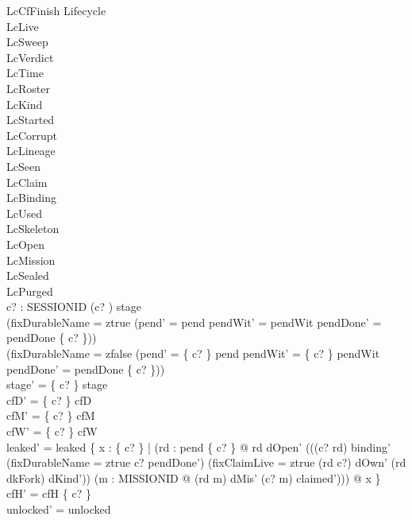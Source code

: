 \documentclass[a4paper,10pt,fleqn]{article}
\begin{document}
\begin{schema}{LcCfFinish}
\Delta Lifecycle \\
\Xi LcLive \\
\Xi LcSweep \\
\Xi LcVerdict \\
\Xi LcTime \\
\Xi LcRoster \\
\Xi LcKind \\
\Xi LcStarted \\
\Xi LcCorrupt \\
\Xi LcLineage \\
\Xi LcSeen \\
\Xi LcClaim \\
\Xi LcBinding \\
\Xi LcUsed \\
\Xi LcSkeleton \\
\Xi LcOpen \\
\Xi LcMission \\
\Xi LcSealed \\
\Xi LcPurged \\
c? : SESSIONID
\where
(c? ) \in stage \\
(fixDurableName = ztrue \implies (pend' = pend \land pendWit' = pendWit \land pendDone' = pendDone \cup \{ c? \})) \\
(fixDurableName = zfalse \implies (pend' = \{ c? \} \ndres pend \land pendWit' = \{ c? \} \ndres pendWit \land pendDone' = pendDone \setminus \{ c? \})) \\
stage' = \{ c? \} \ndres stage \\
cfD' = \{ c? \} \ndres cfD \\
cfM' = \{ c? \} \ndres cfM \\
cfW' = \{ c? \} \ndres cfW \\
leaked' = leaked \cup \{ x : \{ c? \} | (\exists rd : pend \limg \{ c? \} \rimg @ rd \in dOpen' \land \lnot (((c? \mapsto rd) \in binding' \lor (fixDurableName = ztrue \land c? \in pendDone') \lor (fixClaimLive = ztrue \land (rd \mapsto c?) \in dOwn' \land (rd \mapsto dkFork) \in dKind')) \land (\exists m : MISSIONID @ (rd \mapsto m) \in dMis' \land (c? \mapsto m) \in claimed'))) @ x \} \\
cfH' = cfH \setminus \{ c? \} \\
unlocked' = unlocked
\end{schema}
\end{document}
